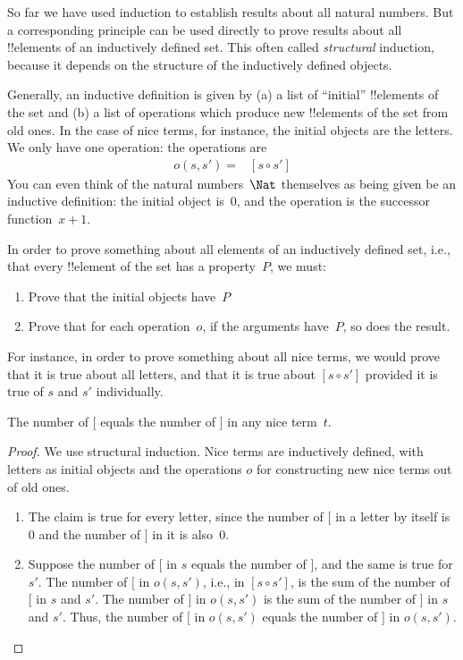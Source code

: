 \documentclass[../../../include/open-logic-section]{subfiles}
\begin{document}


So far we have used induction to establish results about all natural
numbers. But a corresponding principle can be used directly to prove
results about all !!{element}s of an inductively defined set.  This
often called \emph{structural} induction, because it depends on the
structure of the inductively defined objects.

Generally, an inductive definition is given by (a) a list of
``initial'' !!{element}s of the set and (b) a list of operations which
produce new !!{element}s of the set from old ones. In the case of nice
terms, for instance, the initial objects are the letters. We only have
one operation: the operations are
\begin{align*}
  o(s, s') = & [s \circ s']
\end{align*}
You can even think of the natural numbers~$\Nat$ themselves as being
given be an inductive definition: the initial object is~$0$, and the
operation is the successor function~$x + 1$.

In order to prove something about all elements of an inductively
defined set, i.e., that every !!{element} of the set has a
property~$P$, we must:
\begin{enumerate}
\item Prove that the initial objects have~$P$
\item Prove that for each operation~$o$, if the arguments have~$P$,
  so does the result.
\end{enumerate}
For instance, in order to prove something about all nice terms, we
would prove that it is true about all letters, and that it is true
about $[s \circ s']$ provided it is true of $s$ and $s'$ individually.

\begin{prop}
  The number of $[$ equals the number of $]$ in any nice term~$t$.
\end{prop}

\begin{proof}
We use structural induction.  Nice terms are inductively defined, with
letters as initial objects and the operations $o$ for constructing new
nice terms out of old ones.
\begin{enumerate}
\item The claim is true for every letter, since the number of $[$ in a
  letter by itself is~$0$ and the number of $]$ in it is also~$0$.
\item Suppose the number of $[$ in $s$ equals the number of $]$, and
  the same is true for $s'$. The number of $[$ in $o(s, s')$, i.e., in
    $[s \circ s']$, is the sum of the number of $[$ in $s$ and
      $s'$. The number of $]$ in $o(s, s')$ is the sum of the number
    of $]$ in $s$ and $s'$. Thus, the number of $[$ in $o(s, s')$
    equals the number of $]$ in $o(s,s')$.
\end{enumerate}
\end{proof}
\end{document}
